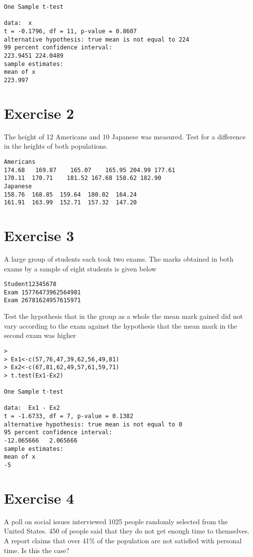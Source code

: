\begin{itemize}
\begin{verbatim}
One Sample t-test

data:  x
t = -0.1796, df = 11, p-value = 0.8607
alternative hypothesis: true mean is not equal to 224
99 percent confidence interval:
223.9451 224.0489
sample estimates:
mean of x
223.997

\end{verbatim}
\section{Exercise 2} 
The height of 12 Americans and 10 Japanese was measured. Test for a difference in the heights of both populations.
\begin{verbatim}
Americans
174.68   169.87    165.07    165.95 204.99 177.61 
170.11  170.71    181.52 167.68 158.62 182.90
Japanese
158.76  168.85  159.64  180.02  164.24
161.91  163.99  152.71  157.32  147.20
\end{verbatim}


\section{Exercise 3}

A large group of students each took two exams. The marks obtained in both exams by a sample of eight students is given below

\begin{verbatim}
Student12345678
Exam 15776473962564981
Exam 26781624957615971
\end{verbatim}
Test the hypothesis that in the group as a whole the mean mark gained did not vary according to the exam against the hypothesis that the mean mark in the second exam was higher
\begin{verbatim}
>
> Ex1<-c(57,76,47,39,62,56,49,81)
> Ex2<-c(67,81,62,49,57,61,59,71)
> t.test(Ex1-Ex2)

One Sample t-test

data:  Ex1 - Ex2
t = -1.6733, df = 7, p-value = 0.1382
alternative hypothesis: true mean is not equal to 0
95 percent confidence interval:
-12.065666   2.065666
sample estimates:
mean of x
-5
\end{verbatim}

\section{Exercise 4}
A poll on social issues interviewed 1025 people randomly selected from the United States. 450 of people said that they do not get enough time to themselves. A report claims that over 41\% of the population are not satisfied with personal time. Is this the case?


\end{itemize}
